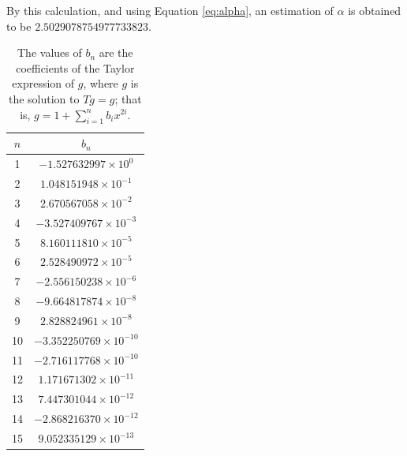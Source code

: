 By this calculation, and using Equation \eqref{eq:alpha}, an estimation of $\alpha$ is obtained to be $2.5029078754977733823$.

\begin{table}
\centering
\begin{tabular}{|c|c|}
\hline
$n$ & $b_n$ \\
\hline
1 & \( -1.527632997 \times 10^{0} \) \\
2 & \( 1.048151948 \times 10^{-1} \) \\
3 & \( 2.670567058 \times 10^{-2} \) \\
4 & \( -3.527409767 \times 10^{-3} \) \\
5 & \( 8.160111810 \times 10^{-5} \) \\
6 & \( 2.528490972 \times 10^{-5} \) \\
7 & \( -2.556150238 \times 10^{-6} \) \\
8 & \( -9.664817874 \times 10^{-8} \) \\
9 & \( 2.828824961 \times 10^{-8} \) \\
10 & \( -3.352250769 \times 10^{-10} \) \\
11 & \( -2.716117768 \times 10^{-10} \) \\
12 & \( 1.171671302 \times 10^{-11} \) \\
13 & \( 7.447301044 \times 10^{-12} \) \\
14 & \( -2.868216370 \times 10^{-12} \) \\
15 & \( 9.052335129 \times 10^{-13} \) \\
\hline
\end{tabular}
\caption{The values of $b_n$ are the coefficients of the Taylor expression of $g$, where $g$ is the solution to $Tg = g$;
that is, $g = 1 + \sum_{i=1}^n b_i x^{2i}$.}
\label{tb:b_i table}
\end{table}